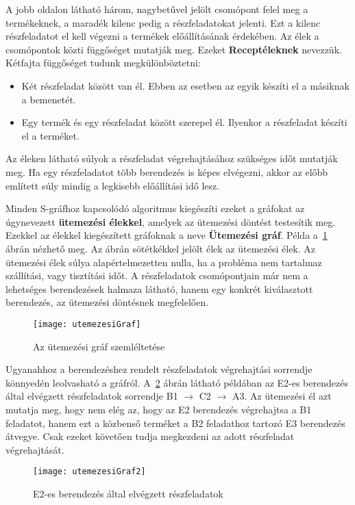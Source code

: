 A jobb oldalon látható három, nagybetűvel jelölt csomópont felel meg a termékeknek, a maradék kilenc pedig a részfeladatokat jelenti.
Ezt a kilenc részfeladatot el kell végezni a termékek előállításának érdekében.
Az élek a csomópontok közti függőséget mutatják meg.
Ezeket \textbf{Receptéleknek} nevezzük.
Kétfajta függőséget tudunk megkülönböztetni:
\begin{itemize}
  \item Két részfeladat között van él.
  Ebben az esetben az egyik készíti el a másiknak a bemenetét.
  \item Egy termék és egy részfeladat között szerepel él.
  Ilyenkor a részfeladat készíti el a terméket.
\end{itemize}
Az éleken látható súlyok a részfeladat végrehajtásához szükséges időt mutatják meg.
Ha egy részfeladatot több berendezés is képes elvégezni, akkor az előbb említett súly mindig a legkisebb előállítási idő lesz.

Minden S-gráfhoz kapcsolódó algoritmus kiegészíti ezeket a gráfokat az úgynevezett \textbf{ütemezési élekkel}, amelyek az ütemezési döntést testesítik meg.
Ezekkel az élekkel kiegészített gráfoknak a neve \textbf{Ütemezési gráf}.
Példa a~\ref{utemezesiGraf} ábrán nézhető meg.
Az ábrán sötétkékkel jelölt élek az ütemezési élek.
Az ütemezési élek súlya alapértelmezetten nulla, ha a probléma nem tartalmaz szállítási, vagy tisztítási időt.
A részfeladatok csomópontjain már nem a lehetséges berendezések halmaza látható, hanem egy konkrét kiválasztott berendezés, az ütemezési döntésnek megfelelően. 
\begin{figure}[H]
\begin{center}
\texttt{[image: utemezesiGraf]}
\caption{Az ütemezési gráf szemléltetése}
\label{utemezesiGraf}
\end{center}
\end{figure}

Ugyanahhoz a berendezéshez rendelt részfeladatok végrehajtási sorrendje könnyedén leolvasható a gráfról.
A~\ref{utemezesiGraf2} ábrán látható példában az E2-es berendezés által elvégzett részfeladatok sorrendje B1 $\to$ C2 $\to$ A3.
Az ütemezési él azt mutatja meg, hogy nem elég az, hogy az E2 berendezés végrehajtsa a B1 feladatot, hanem ezt a közbenső terméket a B2 feladathoz tartozó E3 berendezés átvegye.
Csak ezeket követően tudja megkezdeni az adott részfeladat végrehajtását.
\begin{figure}[H]
\begin{center}
\texttt{[image: utemezesiGraf2]}
\caption{E2-es berendezés által elvégzett részfeladatok}
\label{utemezesiGraf2}
\end{center}
\end{figure}

